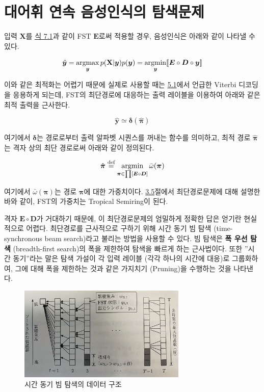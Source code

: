 \documentclass[../main.tex]{subfiles}
\begin{document}
\section{대어휘 연속 음성인식의 탐색문제}

입력 $\mathbf{X}$를 \hyperref[eq:7_1]{식 7.1}과 같이 FST $\bm{E}$로써 적용할 경우, 음성인식은 아래와 같이 나타낼 수 있다. 

\begin{equation}\label{eq:7_5}
    \hat{\bm{y}} = \operatorname*{argmax}_{\bm{y}} p( \mathbf{X} | \bm{y} ) p ( \bm{y} ) = \operatorname*{argmin}_{\bm{y}} [\![\bm{E} \circ \bm{D} \circ \bm{y}]\!]
\end{equation}

이와 같은 최적화는 어렵기 때문에 실제로 사용할 때는 \hyperref[sec:HMM]{5.1}에서 언급한 Viterbi 디코딩을 응용하게 되는데, FST의 최단경로에 대응하는 출력 레이블을 이용하여 아래와 같은 최적 출력을 근사한다. 

\begin{equation}\label{eq:7_6}
    \hat{\bm{y}} \simeq \bm{\delta}(\hat{\bm{\pi}})
\end{equation}

여기에서 $\bm{\delta}$는 경로로부터 출력 알파벳 시퀀스를 꺼내는 함수를 의미하고, 최적 경로 $\hat{\bm{\pi}}$는 격자 상의 최단 경로로써 아래와 같이 정의된다. 

\begin{equation}
    \hat{\bm{\pi}} \stackrel{\text{def}}{=} \operatorname*{argmin}_{\bm{\pi} \in \prod [ \bm{E} \circ \bm{D}] } \bar{\omega}(\bm{\pi})
\end{equation}

여기에서 $\bar{\omega} ( \bm{\pi})$는 경로 $\bm{\pi}$에 대한 가중치이다. 
\hyperref[sec:shortest-path]{3.5}절에서 최단경로문제에 대해 설명한 바와 같이, FST의 가중치는 Tropical Semiring이 된다. 

격자 $\bm{E} \circ \bm{D}$가 거대하기 때문에, 이 최단경로문제의 엄밀하게 정확한 답은 얻기란 현실적으로 어렵다. 
최단경로를 근사적으로 구하기 위해 시간 동기 빔 탐색 (time-synchronous beam search)라고 불리는 방법을 사용할 수 있다. 
빔 탐색은 \textbf{폭 우선 탐색} (breadth-first search)의 폭을 제한하여 탐색을 빠르게 하는 근사법이다. 
또한 ”시간 동기”라는 말은 탐색 가설이 각 입력 레이블 (각각 하나의 시간에 대응)로 그룹화하여, 그에 대해 폭을 제한하는 것과 같은 가지치기 (Pruning)을 수행하는 것을 나타낸다. 

\begin{figure}[h]
    \centering
    \includegraphics[width=8cm]{figures/fig7_3_orig}
    \caption{시간 동기 빔 탐색의 데이터 구조}
\end{figure}
\end{document}

